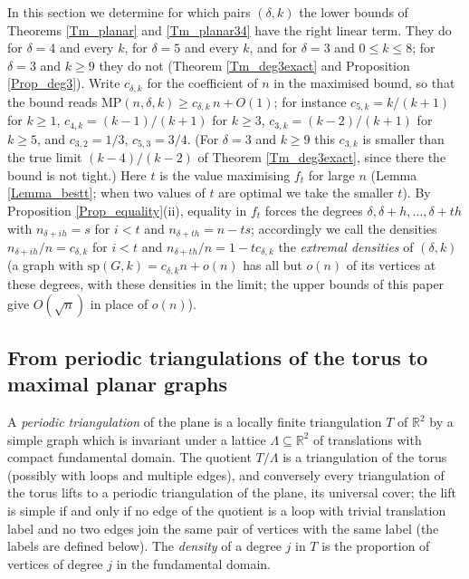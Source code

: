 \documentclass[10pt,a4paper]{article}
\begin{document}
In this section we determine for which pairs $(\delta ,k)$ the lower bounds of Theorems \ref{Tm_planar} and
\ref{Tm_planar34} have the right linear term. They do for $\delta =4$ and every $k$, for $\delta =5$ and
every $k$, and for $\delta =3$ and $0\leq k\leq 8$; for $\delta =3$ and $k\geq 9$ they do not
(Theorem \ref{Tm_deg3exact} and Proposition \ref{Prop_deg3}).
Write $c_{\delta ,k}$ for the coefficient of $n$ in the maximised bound, so that the bound reads
$\mathrm{MP}(n,\delta ,k)\geq c_{\delta ,k}\,n+O(1)$; for instance $c_{5,k}=k/(k+1)$ for $k\geq 1$, $c_{4,k}=(k-1)/(k+1)$ for
$k\geq 3$, $c_{3,k}=(k-2)/(k+1)$ for $k\geq 5$, and $c_{3,2}=1/3$, $c_{5,3}=3/4$. (For $\delta =3$ and $k\geq 9$ this $c_{3,k}$ is smaller than the true limit $(k-4)/(k-2)$ of Theorem \ref{Tm_deg3exact}, since there the bound is not tight.) Here $t$ is the value
maximising $f_{t}$ for large $n$ (Lemma \ref{Lemma_bestt}; when two values of $t$ are optimal we take the smaller $t$). By
Proposition \ref{Prop_equality}(ii), equality in $f_{t}$ forces the degrees $\delta ,\delta +h,\ldots ,\delta +th$ with
$n_{\delta +ih}=s$ for $i<t$ and $n_{\delta +th}=n-ts$; accordingly we call the densities $n_{\delta +ih}/n=c_{\delta ,k}$
for $i<t$ and $n_{\delta +th}/n=1-tc_{\delta ,k}$ the \emph{extremal densities} of $(\delta ,k)$ (a graph with
$\mathrm{sp}(G,k)=c_{\delta ,k}n+o(n)$ has all but $o(n)$ of its vertices at these degrees, with these
densities in the limit; the upper bounds of this paper give $O(\sqrt{n})$ in place of $o(n)$).

\subsection{From periodic triangulations of the torus to maximal planar graphs}

A \emph{periodic triangulation} of the plane is a locally finite triangulation $T$ of $\mathbb{R}^{2}$ by a simple
graph which is invariant under a lattice $\Lambda \subseteq \mathbb{R}^{2}$ of translations with compact fundamental
domain. The quotient $T/\Lambda $ is a triangulation of the torus (possibly with loops and multiple edges), and
conversely every triangulation of the torus lifts to a periodic triangulation of the plane, its universal cover; the
lift is simple if and only if no edge of the quotient is a loop with trivial translation label and no two edges join
the same pair of vertices with the same label (the labels are defined below). The \emph{density} of a degree $j$ in
$T$ is the proportion of vertices of degree $j$ in the fundamental domain.
\end{document}
